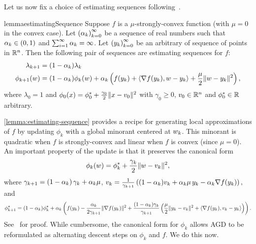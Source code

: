 Let us now fix a choice of estimating sequences following~\citet[Lemma 2.2.2]{nesterov2004lectures}. 
\begin{restatable}{lemma}{estimatingSequence}\label{lemma:estimating-sequence}
    Suppose \( f \) is a \( \mu \)-strongly-convex function (with \( \mu = 0 \) in the convex case).
    Let \( \left(\alpha_{k}\right)_{k=0}^\infty \) be a sequence of real numbers such that \( \alpha_{k} \in (0,1) \) and \( \sum_{i=1}^\infty \alpha_{k} = \infty \). 
    Let \( \left(y_k\right)_{k=0}^\infty \) be an arbitrary of sequence of points in \( \mathbb{R}^n \).
    Then the following pair of sequences are estimating sequences for \( f \):
    \begin{align*}
        \lambda_{k+1} &= (1- \alpha_k) \lambda_k\\
        \phi_{k+1}(w) &= (1-\alpha_k) \phi_k(w) + \alpha_k \left(f(y_k) + \left\langle\nabla f(y_k), w - y_k\right\rangle + \frac{\mu}{2} \|w - y_k\|^2\right),
    \end{align*}
    where \( \lambda_0 = 1 \) and \( \phi_0(x) = \phi_0^* + \frac{\gamma_0}{2}\|x - v_0\|^2 \) with \( \gamma_0 \geq 0 \), \( v_0 \in \mathbb{R}^n \) and \( \phi_0^* \in \mathbb{R} \) arbitrary.
\end{restatable}

\autoref{lemma:estimating-sequence} provides a recipe for generating local approximations of \( f \) by updating \( \phi_k \) with a global minorant centered at \( w_k \). 
This minorant is quadratic when \( f \) is strongly-convex and linear when \( f \) is convex (since \( \mu = 0 \)).
An important property of the update is that it preserves the canonical form
\begin{align*}
    \phi_k(w) = \phi_k^* + \frac{\gamma_k}{2}\|w - v_k\|^2,
\end{align*}
where \( \gamma_{k+1} = \left(1 - \alpha_{k}\right)\gamma_k + \alpha_{k} \mu \), \( v_k = \frac{1}{\gamma_{k+1}} \left((1-\alpha_{k})v_k + \alpha_{k} \mu \, y_k - \alpha_{k} \nabla f(y_k)\right), \) and 
\[ \phi^*_{k+1} = (1 - \alpha_{k}) \phi^*_k + \alpha_{k}\left(f(y_k) - \frac{\alpha_{k}}{2 \gamma_{k+1}} \|\nabla f(y_k)\|^2 + \frac{(1 - \alpha_{k})\gamma_k}{\gamma_{k+1}}\left(\frac{\mu}{2}\|y_k - v_k\|^2 + \left\langle\nabla f(y_k), v_k - y_k\right\rangle\right)\right). \]
See~\citet[Lemma 2.2.3]{nesterov2004lectures} for proof.
While cumbersome, the canonical form for \( \phi_k \) allows \ac{AGD} to be reformulated as alternating descent steps on \( \phi_k \) and \( f \).
We do this now.

